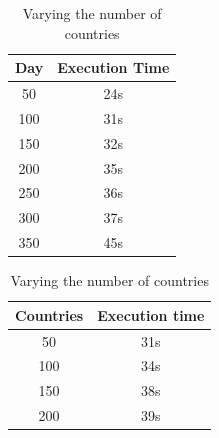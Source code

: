\documentclass[11pt]{article}
\begin{document}
\begin{table}[htbp]
\begin{minipage}{0.5\textwidth}
  \centering
  \caption{Varying the number of days}
  \label{tab:dates}
  \begin{tabular}{|c|c|}
    \hline
    \textbf{Day} & \textbf{Execution Time} \\
    \hline
    50 & 24s \\
    100 & 31s \\
    150 & 32s \\
    200 & 35s \\
    250 & 36s \\
    300 & 37s \\
    350 & 45s \\
    \hline
  \end{tabular}
\end{minipage}%
\begin{minipage}{0.5\textwidth}
  \centering
  \caption{Varying the number of countries}
  \label{tab:countries}
  \begin{tabular}{|c|c|}
    \hline
    \textbf{Countries} & \textbf{Execution time} \\
    \hline
    50 & 31s \\
    100 & 34s \\
    150 & 38s \\
    200 & 39s \\
    \hline
  \end{tabular}
\end{minipage}
\end{table}
\end{document}
